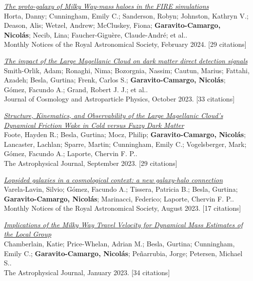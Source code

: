 \documentclass[14pt]{article}
\begin{document}
\begin{etaremune}
\item \textit{\href{https://ui.adsabs.harvard.edu/abs/2024MNRAS.527.9810H/abstract}{The proto-galaxy of Milky Way-mass haloes in the FIRE simulations}}\\
  {\small \color{darkgray} Horta, Danny; Cunningham, Emily C.; Sanderson, Robyn; Johnston, Kathryn V.; Deason, Alis; Wetzel, Andrew; McCluskey, Fiona; \textbf{Garavito-Camargo, Nicolás}; Necib, Lina; Faucher-Giguère, Claude-André; et al..\\
  Monthly Notices of the Royal Astronomical Society, February 2024. [29 citations]}

\item \textit{\href{https://ui.adsabs.harvard.edu/abs/2023JCAP...10..070S/abstract}{The impact of the Large Magellanic Cloud on dark matter direct detection signals}}\\
  {\small \color{darkgray} Smith-Orlik, Adam; Ronaghi, Nima; Bozorgnia, Nassim; Cautun, Marius; Fattahi, Azadeh; Besla, Gurtina; Frenk, Carlos S.; \textbf{Garavito-Camargo, Nicolás}; Gómez, Facundo A.; Grand, Robert J. J.; et al..\\
  Journal of Cosmology and Astroparticle Physics, October 2023. [33 citations]}

\item \textit{\href{https://ui.adsabs.harvard.edu/abs/2023ApJ...954..163F/abstract}{Structure, Kinematics, and Observability of the Large Magellanic Cloud's Dynamical Friction Wake in Cold versus Fuzzy Dark Matter}}\\
  {\small \color{darkgray} Foote, Hayden R.; Besla, Gurtina; Mocz, Philip; \textbf{Garavito-Camargo, Nicolás}; Lancaster, Lachlan; Sparre, Martin; Cunningham, Emily C.; Vogelsberger, Mark; Gómez, Facundo A.; Laporte, Chervin F. P..\\
  The Astrophysical Journal, September 2023. [29 citations]}

\item \textit{\href{https://ui.adsabs.harvard.edu/abs/2023MNRAS.523.5853V/abstract}{Lopsided galaxies in a cosmological context: a new galaxy-halo connection}}\\
  {\small \color{darkgray} Varela-Lavin, Silvio; Gómez, Facundo A.; Tissera, Patricia B.; Besla, Gurtina; \textbf{Garavito-Camargo, Nicolás}; Marinacci, Federico; Laporte, Chervin F. P..\\
  Monthly Notices of the Royal Astronomical Society, August 2023. [17 citations]}

\item \textit{\href{https://ui.adsabs.harvard.edu/abs/2023ApJ...942...18C/abstract}{Implications of the Milky Way Travel Velocity for Dynamical Mass Estimates of the Local Group}}\\
  {\small \color{darkgray} Chamberlain, Katie; Price-Whelan, Adrian M.; Besla, Gurtina; Cunningham, Emily C.; \textbf{Garavito-Camargo, Nicolás}; Peñarrubia, Jorge; Petersen, Michael S..\\
  The Astrophysical Journal, January 2023. [34 citations]}


\end{etaremune}
\end{document}
